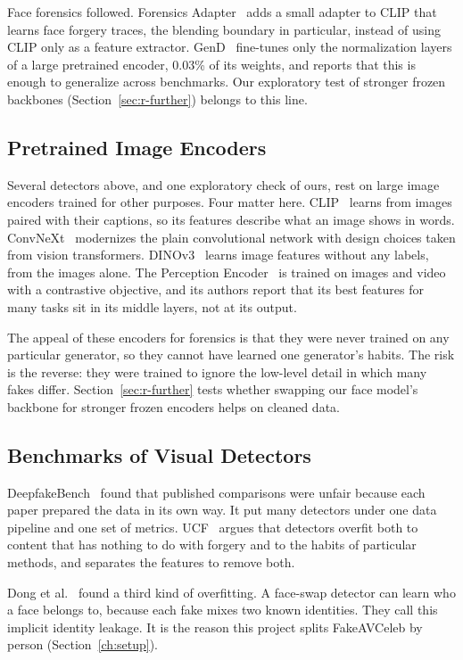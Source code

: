 Face forensics followed. Forensics Adapter~\cite{forensicsadapter} adds a
small adapter to CLIP that learns face forgery traces, the blending boundary
in particular, instead of using CLIP only as a feature extractor.
GenD~\cite{gend} fine-tunes only the normalization layers of a large
pretrained encoder, 0.03\% of its weights, and reports that this is enough to
generalize across benchmarks. Our exploratory test of stronger frozen
backbones (Section~\ref{sec:r-further}) belongs to this line.

\subsection{Pretrained Image Encoders}

Several detectors above, and one exploratory check of ours, rest on large
image encoders trained for other purposes. Four matter here.
CLIP~\cite{clip} learns from images paired with their captions, so its
features describe what an image shows in words. ConvNeXt~\cite{convnext}
modernizes the plain convolutional network with design choices taken from
vision transformers. DINOv3~\cite{dinov3} learns image features without any
labels, from the images alone. The Perception Encoder~\cite{pe} is trained on
images and video with a contrastive objective, and its authors report that its
best features for many tasks sit in its middle layers, not at its output.

The appeal of these encoders for forensics is that they were never trained on
any particular generator, so they cannot have learned one generator's habits.
The risk is the reverse: they were trained to ignore the low-level detail in
which many fakes differ. Section~\ref{sec:r-further} tests whether swapping
our face model's backbone for stronger frozen encoders helps on cleaned data.

\subsection{Benchmarks of Visual Detectors}

DeepfakeBench~\cite{deepfakebench} found that published comparisons were
unfair because each paper prepared the data in its own way. It put many
detectors under one data pipeline and one set of metrics. UCF~\cite{ucf}
argues that detectors overfit both to content that has nothing to do with
forgery and to the habits of particular methods, and separates the features
to remove both.

Dong et al.~\cite{dong2023} found a third kind of overfitting. A face-swap
detector can learn who a face belongs to, because each fake mixes two known
identities. They call this implicit identity leakage. It is the reason this
project splits FakeAVCeleb by person (Section~\ref{ch:setup}).

